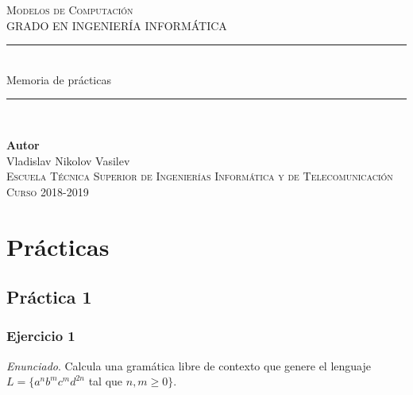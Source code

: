 \documentclass[11pt,a4paper]{article}
\newcommand{\enu}{\textit{Enunciado}}
\begin{document}
	
	\begin{titlepage}

		\begin{minipage}{\textwidth}

			\centering
			\textsc{\Large Modelos de Computación\\[0.2cm]}
			\textsc{GRADO EN INGENIERÍA INFORMÁTICA}\\[1cm]

			\noindent\rule[-1ex]{\textwidth}{1pt}\\[3.5ex]
			{\Huge Memoria de prácticas\\}
			\noindent\rule[-1ex]{\textwidth}{2pt}\\[3.5ex]
		\end{minipage}

		\vspace{1.5cm}
		
		\begin{minipage}{\textwidth}
			\centering

			\textbf{Autor}\\ {Vladislav Nikolov Vasilev}\\[2.5ex]

			\vspace{1cm}
			\textsc{Escuela Técnica Superior de Ingenierías Informática y de Telecomunicación}\\
			\vspace{1cm}
			\textsc{Curso 2018-2019}
		\end{minipage}
	\end{titlepage}
	
	\tableofcontents
	\newpage
	
	\section{Prácticas}
	
	\subsection{Práctica 1}
	
		\subsubsection{Ejercicio 1}
		\enu. Calcula una gramática libre de contexto que genere el lenguaje  
		$L = \lbrace a^n b^m c^m d^{2n}$ 
		tal que 
		$ n, m \geq 0 \rbrace$. \par
		
\end{document}
